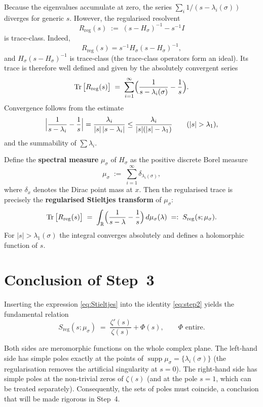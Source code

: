 \documentclass[11pt,a4paper]{article}
\newcommand{\supp}{\operatorname{supp}}
\newcommand{\Tr}{\operatorname{Tr}}
\begin{document}
Because the eigenvalues accumulate at zero, the series \(\sum_i 1/(s - \lambda_i(\sigma))\) diverges for generic \(s\).  However, the regularised resolvent
\[
R_{\mathrm{reg}}(s) \;:=\; (s - H_\sigma)^{-1} - s^{-1}I
\]
is trace‑class.  Indeed,
\[
R_{\mathrm{reg}}(s) = s^{-1} H_\sigma (s - H_\sigma)^{-1},
\]
and \(H_\sigma (s - H_\sigma)^{-1}\) is trace‑class (the trace‑class operators form an ideal).  Its trace is therefore well defined and given by the absolutely convergent series
\[
\Tr\big[ R_{\mathrm{reg}}(s) \big] \;=\; \sum_{i=1}^\infty \Bigl( \frac{1}{s - \lambda_i(\sigma)} - \frac{1}{s} \Bigr).
\]
Convergence follows from the estimate
\[
\Bigl| \frac{1}{s - \lambda_i} - \frac{1}{s} \Bigr|
= \frac{\lambda_i}{|s|\,|s - \lambda_i|}
\le \frac{\lambda_i}{|s|(|s| - \lambda_1)} \qquad (|s| > \lambda_1),
\]
and the summability of \(\sum \lambda_i\).

Define the \textbf{spectral measure} \(\mu_\sigma\) of \(H_\sigma\) as the positive discrete Borel measure
\[
\mu_\sigma \;:=\; \sum_{i=1}^\infty \delta_{\lambda_i(\sigma)},
\]
where \(\delta_x\) denotes the Dirac point mass at \(x\).  Then the regularised trace is precisely the \textbf{regularised Stieltjes transform} of \(\mu_\sigma\):
\begin{equation}\label{eq:Stieltjes}
\Tr\big[ R_{\mathrm{reg}}(s) \big] \;=\; \int_{\mathbb{R}}
\Bigl( \frac{1}{s - \lambda} - \frac{1}{s} \Bigr) \, d\mu_\sigma(\lambda)
\;=:\; S_{\mathrm{reg}}(s;\mu_\sigma).
\end{equation}
For \(|s| > \lambda_1(\sigma)\) the integral converges absolutely and defines a holomorphic function of \(s\).

\section{Conclusion of Step~3}

Inserting the expression \eqref{eq:Stieltjes} into the identity \eqref{eq:step2} yields the fundamental relation
\begin{equation}\label{eq:main3}
\boxed{\; S_{\mathrm{reg}}(s;\mu_\sigma) \;=\; \frac{\zeta'(s)}{\zeta(s)} + \Phi(s), \qquad \Phi \text{ entire}. \;}
\end{equation}

Both sides are meromorphic functions on the whole complex plane.  The left‑hand side has simple poles exactly at the points of \(\supp\mu_\sigma = \{\lambda_i(\sigma)\}\) (the regularisation removes the artificial singularity at \(s=0\)).  The right‑hand side has simple poles at the non‑trivial zeros of \(\zeta(s)\) (and at the pole \(s=1\), which can be treated separately).  Consequently, the sets of poles must coincide, a conclusion that will be made rigorous in Step~4.
\end{document}
